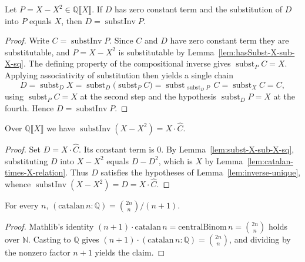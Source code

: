\begin{lemma}
    \label{lem:inverse-unique}
    \leanok
    Let $P = X - X^2 \in \mathbb{Q}\llbracket X\rrbracket$. If $D$ has zero constant term and the
    substitution of $D$ into $P$ equals $X$, then $D = \operatorname{substInv} P$.
\end{lemma}
\begin{proof}
    Write $C = \operatorname{substInv} P$. Since $C$ and $D$ have zero constant term they are
    substitutable, and $P = X - X^2$ is substitutable by
    Lemma~\ref{lem:hasSubst-X-sub-X-sq}. The defining property of the compositional inverse
    gives $\operatorname{subst}_P C = X$. Applying associativity of substitution then yields a
    single chain
    \[
      D = \operatorname{subst}_D X
        = \operatorname{subst}_D\bigl(\operatorname{subst}_P C\bigr)
        = \operatorname{subst}_{\,\operatorname{subst}_D P}\, C
        = \operatorname{subst}_X C = C,
    \]
    using $\operatorname{subst}_P C = X$ at the second step and the hypothesis
    $\operatorname{subst}_D P = X$ at the fourth. Hence $D = \operatorname{substInv} P$.
\end{proof}

\begin{lemma}
    \label{lem:substInv-eq-X-mul-catalan}
    \leanok
    Over $\mathbb{Q}\llbracket X\rrbracket$ we have $\operatorname{substInv}(X - X^2) = X \cdot \hat C$.
\end{lemma}
\begin{proof}
    Set $D = X \cdot \hat C$. Its constant term is $0$. By
    Lemma~\ref{lem:subst-X-sub-X-sq}, substituting $D$ into $X - X^2$ equals $D - D^2$, which is
    $X$ by Lemma~\ref{lem:catalan-times-X-relation}. Thus $D$ satisfies the hypotheses of
    Lemma~\ref{lem:inverse-unique}, whence $\operatorname{substInv}(X - X^2) = D = X \cdot \hat C$.
\end{proof}

\begin{lemma}
    \label{lem:catalan-rat-formula}
    \leanok
    For every $n$, $(\mathrm{catalan}\,n : \mathbb{Q}) = \binom{2n}{n}/(n+1)$.
\end{lemma}
\begin{proof}
    Mathlib's identity $(n+1)\cdot \mathrm{catalan}\,n = \mathrm{centralBinom}\,n = \binom{2n}{n}$
    holds over $\mathbb{N}$. Casting to $\mathbb{Q}$ gives
    $(n+1)\cdot(\mathrm{catalan}\,n : \mathbb{Q}) = \binom{2n}{n}$, and dividing by the nonzero
    factor $n + 1$ yields the claim.
\end{proof}


